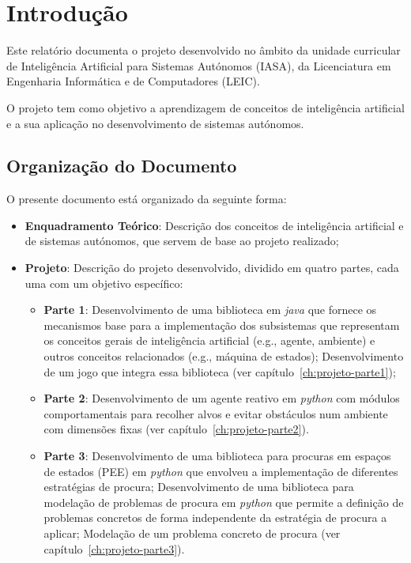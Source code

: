 \chapter{Introdução}\label{ch:introducao}

Este relatório documenta o projeto desenvolvido no âmbito da unidade curricular de Inteligência Artificial para Sistemas Autónomos (IASA), da Licenciatura em Engenharia Informática e de Computadores (LEIC).

O projeto tem como objetivo a aprendizagem de conceitos de inteligência artificial e a sua aplicação no desenvolvimento de sistemas autónomos.

\section{Organização do Documento}\label{sec:organizacao-documento}

O presente documento está organizado da seguinte forma:
\begin{itemize}
    \item \textbf{Enquadramento Teórico}: Descrição dos conceitos de inteligência artificial e de sistemas autónomos, que servem de base ao projeto realizado;
    \item \textbf{Projeto}: Descrição do projeto desenvolvido, dividido em quatro partes, cada uma com um objetivo específico:
    \begin{itemize}
        \item \textbf{Parte 1}: Desenvolvimento de uma biblioteca em \textit{java} que fornece os mecanismos base para a implementação dos subsistemas que representam os conceitos gerais de inteligência artificial (e.g., agente, ambiente) e outros conceitos relacionados (e.g., máquina de estados); Desenvolvimento de um jogo que integra essa biblioteca (ver capítulo~\ref{ch:projeto-parte1});
        \item \textbf{Parte 2}: Desenvolvimento de um agente reativo em \textit{python} com módulos comportamentais para recolher alvos e evitar obstáculos num ambiente com dimensões fixas (ver capítulo~\ref{ch:projeto-parte2}).
        \item \textbf{Parte 3}: Desenvolvimento de uma biblioteca para procuras em espaços de estados (PEE) em \textit{python} que envolveu a implementação de diferentes estratégias de procura; Desenvolvimento de uma biblioteca para modelação de problemas de procura em \textit{python} que permite a definição de problemas concretos de forma independente da estratégia de procura a aplicar; Modelação de um problema concreto de procura (ver capítulo~\ref{ch:projeto-parte3}).
    \end{itemize}
\end{itemize}

